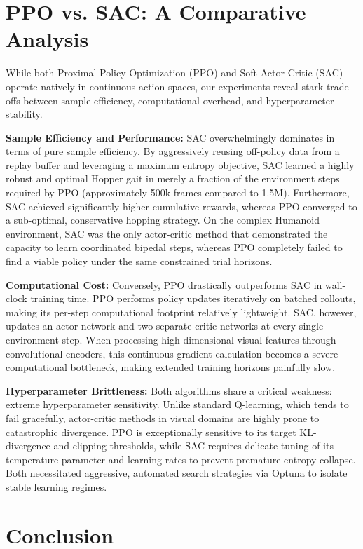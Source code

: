 \section{PPO vs. SAC: A Comparative Analysis}
\label{sec:ppo_vs_sac}

While both Proximal Policy Optimization (PPO) and Soft Actor-Critic (SAC) operate natively in continuous action spaces, our experiments reveal stark trade-offs between sample efficiency, computational overhead, and hyperparameter stability.

\textbf{Sample Efficiency and Performance:} 
SAC overwhelmingly dominates in terms of pure sample efficiency. By aggressively reusing off-policy data from a replay buffer and leveraging a maximum entropy objective, SAC learned a highly robust and optimal Hopper gait in merely a fraction of the environment steps required by PPO (approximately 500k frames compared to 1.5M). Furthermore, SAC achieved significantly higher cumulative rewards, whereas PPO converged to a sub-optimal, conservative hopping strategy. On the complex Humanoid environment, SAC was the only actor-critic method that demonstrated the capacity to learn coordinated bipedal steps, whereas PPO completely failed to find a viable policy under the same constrained trial horizons.

\textbf{Computational Cost:} 
Conversely, PPO drastically outperforms SAC in wall-clock training time. PPO performs policy updates iteratively on batched rollouts, making its per-step computational footprint relatively lightweight. SAC, however, updates an actor network and two separate critic networks at every single environment step. When processing high-dimensional visual features through convolutional encoders, this continuous gradient calculation becomes a severe computational bottleneck, making extended training horizons painfully slow.

\textbf{Hyperparameter Brittleness:} 
Both algorithms share a critical weakness: extreme hyperparameter sensitivity. Unlike standard Q-learning, which tends to fail gracefully, actor-critic methods in visual domains are highly prone to catastrophic divergence. PPO is exceptionally sensitive to its target KL-divergence and clipping thresholds, while SAC requires delicate tuning of its temperature parameter and learning rates to prevent premature entropy collapse. Both necessitated aggressive, automated search strategies via Optuna to isolate stable learning regimes.

\section{Conclusion}
\label{sec:conclusion_final}

